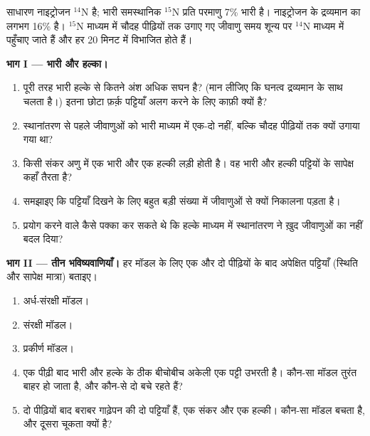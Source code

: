 \begin{problem}
\label{pb:g11:dna-replication:1}
साधारण नाइट्रोजन $^{14}$N है; भारी समस्थानिक $^{15}$N प्रति परमाणु 7\%
भारी है। नाइट्रोजन  के द्रव्यमान का लगभग 16\% है। $^{15}$N माध्यम में
चौदह पीढ़ियों तक उगाए गए जीवाणु समय शून्य पर $^{14}$N माध्यम में पहुँचाए
जाते हैं और हर 20 मिनट में विभाजित होते हैं।

\medskip
\noindent\textbf{भाग I --- भारी और हल्का।}
\begin{enumerate}
  \item पूरी तरह भारी  हल्के  से कितने अंश अधिक सघन है? (मान लीजिए
        कि घनत्व द्रव्यमान के साथ चलता है।) इतना छोटा फ़र्क़ पट्टियाँ अलग
        करने के लिए काफ़ी क्यों है?
  \item स्थानांतरण से पहले जीवाणुओं को भारी माध्यम में एक-दो नहीं, बल्कि
        चौदह पीढ़ियों तक क्यों उगाया गया था?
  \item किसी संकर अणु में एक भारी और एक हल्की लड़ी होती है। वह भारी और
        हल्की पट्टियों के सापेक्ष कहाँ तैरता है?
  \item समझाइए कि पट्टियाँ दिखने के लिए  बहुत बड़ी संख्या में
        जीवाणुओं से क्यों निकालना पड़ता है।
  \item प्रयोग करने वाले कैसे पक्का कर सकते थे कि हल्के माध्यम में
        स्थानांतरण ने ख़ुद जीवाणुओं का  नहीं बदल दिया?
\end{enumerate}

\medskip
\noindent\textbf{भाग II --- तीन भविष्यवाणियाँ।}
हर मॉडल के लिए एक और दो पीढ़ियों के बाद अपेक्षित पट्टियाँ (स्थिति और
सापेक्ष मात्रा) बताइए।
\begin{enumerate}[resume]
  \item अर्ध-संरक्षी मॉडल।
  \item संरक्षी मॉडल।
  \item प्रकीर्ण मॉडल।
  \item एक पीढ़ी बाद भारी और हल्के के ठीक बीचोबीच अकेली एक पट्टी उभरती
        है। कौन-सा मॉडल तुरंत बाहर हो जाता है, और कौन-से दो बचे रहते
        हैं?
  \item दो पीढ़ियों बाद बराबर गाढ़ेपन की दो पट्टियाँ हैं, एक संकर और एक
        हल्की। कौन-सा मॉडल बचता है, और दूसरा चूकता क्यों है?
\end{enumerate}


\end{problem}
